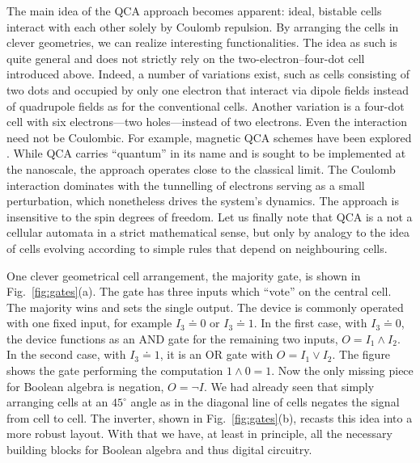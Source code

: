 The main idea of the QCA approach becomes apparent: ideal, bistable cells
interact with each other solely by Coulomb repulsion. By arranging the cells in
clever geometries, we can realize interesting functionalities. The idea as such
is quite general and does not strictly rely on the two-electron--four-dot cell
introduced above. Indeed, a number of variations exist, such as cells consisting
of two dots and occupied by only one electron that interact via dipole fields
instead of quadrupole fields as for the conventional cells. Another variation is
a four-dot cell with six electrons---two holes---instead of two electrons. Even
the interaction need not be Coulombic. For example, magnetic QCA schemes have
been explored \cite{bernstein2005magnetic}. While QCA carries ``quantum'' in its
name and is sought to be implemented at the nanoscale, the approach operates
close to the classical limit. The Coulomb interaction dominates with the
tunnelling of electrons serving as a small perturbation, which nonetheless
drives the system's dynamics. The approach is insensitive to the spin degrees of
freedom. Let us finally note that QCA is a not a cellular automata in a strict
mathematical sense, but only by analogy to the idea of cells evolving according
to simple rules that depend on neighbouring cells.

One clever geometrical cell arrangement, the majority gate, is shown in
Fig.~\ref{fig:gates}(a). The gate has three inputs which ``vote'' on the
central cell. The majority wins and sets the single output. The device is
commonly operated with one fixed input, for example $I_3 \doteq 0$ or $I_3
\doteq 1$. In the first case, with $I_3 \doteq 0$, the device functions as an
AND gate for the remaining two inputs, $O = I_1 \land I_2$. In the second case,
with $I_3 \doteq 1$, it is an OR gate with $O = I_1 \lor I_2$. The figure shows
the gate performing the computation $1 \land 0 = 1$. Now the only missing piece
for Boolean algebra is negation, $O = \lnot I$. We had already seen that simply
arranging cells at an $45^{\circ}$ angle as in the diagonal line of cells
negates the signal from cell to cell. The inverter, shown in
Fig.~\ref{fig:gates}(b), recasts this idea into a more robust layout. With
that we have, at least in principle, all the necessary building blocks for
Boolean algebra and thus digital circuitry.

